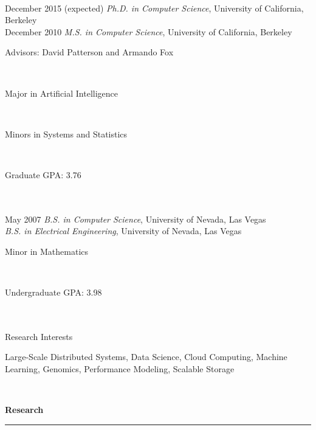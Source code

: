 \documentclass[11pt]{article}
\newcommand{\parwidthNarrow}{4.8 in}
\newcommand{\tabwidthWide}{2.0 in}
\newcommand{\head}[1]{
{\bf #1} \\
\rule{\textwidth}{0.01 in}

\vspace{-0.35 in}

}
\begin{document}
\begin{tabbing}
\hspace{\tabwidthWide} \= \\ 

December 2015 (expected) \> \emph{Ph.D. in Computer Science}, University of California, Berkeley \\ 
December 2010 \> \emph{M.S. in Computer Science}, University of California, Berkeley \\ 
\> \parbox[t]{\parwidthNarrow}{Advisors: David Patterson and Armando Fox } \\ 
\> \parbox[t]{\parwidthNarrow}{Major in Artificial Intelligence} \\
\> \parbox[t]{\parwidthNarrow}{Minors in Systems and Statistics} \\
\> \parbox[t]{\parwidthNarrow}{Graduate GPA: 3.76} \\ \\

May 2007 \> \emph{B.S. in Computer Science}, University of Nevada, Las Vegas \\ 
\> \emph{B.S. in Electrical Engineering}, University of Nevada, Las Vegas \\ 
\> \parbox[t]{\parwidthNarrow}{Minor in Mathematics} \\
\> \parbox[t]{\parwidthNarrow}{Undergraduate GPA: 3.98} \\ \\

Research Interests \> \parbox[t]{\parwidthNarrow}{
Large-Scale Distributed Systems, Data Science, Cloud Computing, Machine Learning, Genomics, Performance Modeling, Scalable Storage
} \\

\end{tabbing}



\head{Research}
\end{document}
